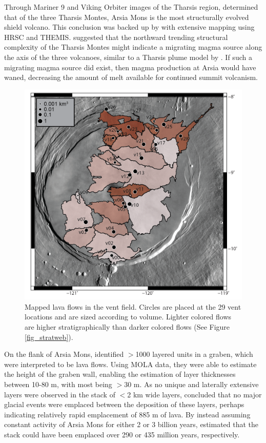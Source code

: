 \documentclass[12pt,letter]{article}
\begin{document}
Through Mariner 9 and Viking Orbiter images of the Tharsis region, \citet{crumpler1978structural} determined that of the three Tharsis Montes, Arsia Mons is the most structurally evolved shield volcano. This conclusion was backed up by \citet{bleacher2007tharsis} with extensive mapping using HRSC and THEMIS. \citet{bleacher2007tharsis} suggested that the northward trending structural complexity of the Tharsis Montes might indicate a migrating magma source along the axis of the three volcanoes, similar to a Tharsis plume model by \citet{mege1996plume}. If such a migrating magma source did exist, then magma production at Arsia would have waned, decreasing the amount of melt available for continued summit volcanism.

\begin{figure}
\centering
\includegraphics[width=0.7\linewidth]{figures/vent_map-01}
\caption{Mapped lava flows in the vent field. Circles are placed at the 29 vent locations and are sized according to volume. Lighter colored flows are higher stratigraphically than darker colored flows (See Figure \ref{fig_stratweb}).}
\label{fig_lavamap}
\end{figure}

On the flank of Arsia Mons, \citet{mouginis2008lava} identified $>$1000 layered units in a graben, which were interpreted to be lava flows. Using MOLA data, they were able to estimate the height of the graben wall, enabling the estimation of layer thicknesses between 10-80 m, with most being $>$30 m. As no unique and laterally extensive layers were observed in the stack of $<$2 km wide layers, \citet{mouginis2008lava} concluded that no major glacial events were emplaced between the deposition of these layers, perhaps indicating relatively rapid emplacement of 885 m of lava. By instead assuming constant activity of Arsia Mons for either 2 or 3 billion years, \citet{mouginis2008lava} estimated that the stack could have been emplaced over 290 or 435 million years, respectively. 
\end{document}
